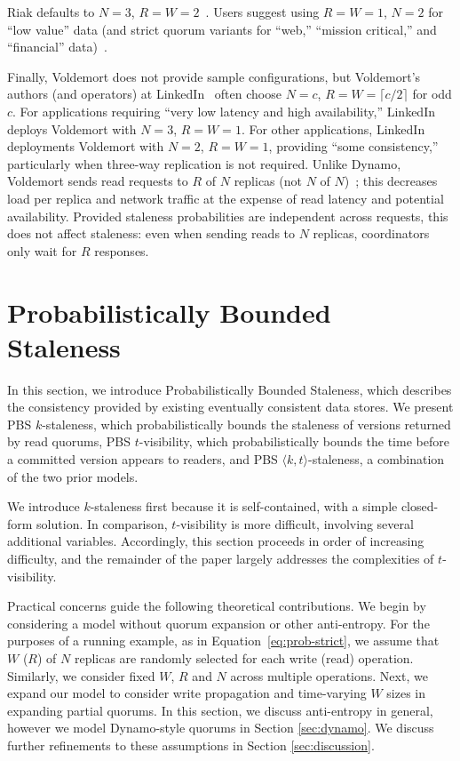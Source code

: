 \documentclass{vldb}
\newcommand{\sectionskip}{-0em}
\begin{document}
Riak defaults to $N$$=$$3$, $R$$=$$W$$=$$2$~\cite{riakdefault-n,
  riakdefault-rw}. Users suggest using $R$$=$$W$$=$$1$, $N$$=$$2$ for
``low value'' data (and strict quorum variants for ``web,''
``mission critical,'' and ``financial'' data)~\cite{riaktalkone,
  riaktalktwo}.

 Finally, Voldemort does not provide sample configurations, but
 Voldemort's authors (and operators) at LinkedIn~\cite{feinbergpc}
 often choose $N$$=$$c$, $R$$=$$W$$=$$ \lceil c/2 \rceil$ for odd $c$.
 For applications requiring ``very low latency and high
 availability,'' LinkedIn deploys Voldemort with $N$$=$$3$,
 $R$$=$$W$$=$$1$.  For other applications, LinkedIn deployments
 Voldemort with $N$$=$$2$, $R$$=$$W$$=$$1$, providing ``some
 consistency,'' particularly when three-way replication is not
 required.  Unlike Dynamo, Voldemort sends read requests to $R$ of $N$
 replicas (not $N$ of $N$)~\cite{voldemortpub}; this decreases load
 per replica and network traffic at the expense of read latency and
 potential availability.  Provided staleness probabilities are
 independent across requests, this does not affect staleness: even
 when sending reads to $N$ replicas, coordinators only wait for $R$
 responses.

\vspace{\sectionskip}\section{Probabilistically Bounded\\Staleness}
\label{sec:pbs}

In this section, we introduce Probabilistically Bounded Staleness,
which describes the consistency provided by existing eventually
consistent data stores.  We present PBS $k$-staleness, which
probabilistically bounds the staleness of versions returned by read
quorums, PBS $t$-visibility, which probabilistically bounds the time
before a committed version appears to readers, and PBS $\langle k, t
\rangle$-staleness, a combination of the two prior models.

We introduce $k$-staleness first because it is self-contained, with a
simple closed-form solution.  In comparison, $t$-visibility is more
difficult, involving several additional variables.  Accordingly, this
section proceeds in order of increasing difficulty, and the remainder
of the paper largely addresses the complexities of $t$-visibility.

Practical concerns guide the following theoretical contributions.  We
begin by considering a model without quorum expansion or other
anti-entropy.  For the purposes of a running example, as in
Equation~\ref{eq:prob-strict}, we assume that $W$ ($R$) of $N$
replicas are randomly selected for each write (read) operation.
Similarly, we consider fixed $W$, $R$ and $N$ across multiple
operations. Next, we expand our model to consider write propagation
and time-varying $W$ sizes in expanding partial quorums.  In this
section, we discuss anti-entropy in general, however we model
Dynamo-style quorums in Section \ref{sec:dynamo}. We discuss further
refinements to these assumptions in Section \ref{sec:discussion}.
\end{document}
